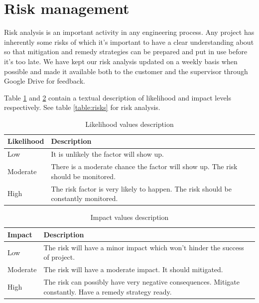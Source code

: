 \newpage
\section{Risk management}
\label{section:risk}

Risk analysis is an important activity in any engineering process.
Any project has inherently some risks of which it's important to have a clear
understanding about so that mitigation and remedy strategies can be prepared
and put in use before it's too late. We have kept our risk analysis updated on a weekly
basis when possible and made it available both to the customer and the supervisor through
Google Drive for feedback.

Table \ref{table:likelihood} and \ref{table:impact} contain a textual description of
likelihood and impact levels respectively. See table \ref{table:risks} for risk analysis.

\begin{table}[h]
\begin{tabular}{ | l | p{11.5cm} | }
  \hline
  \textbf{Likelihood} & \textbf{Description} \\
  \hline\noalign{\smallskip}\hline
  Low       & It is unlikely the factor will show up. \\
  Moderate  & There is a moderate chance the factor will show up. The risk should be monitored. \\
  High      & The risk factor is very likely to happen. The risk should be constantly monitored. \\
  \hline
\end{tabular}
\caption{Likelihood values description}
\label{table:likelihood}
\end{table}

\begin{table}[h]
\begin{tabular}{ | l | p{11.5cm} | }
  \hline
  \textbf{Impact} & \textbf{Description} \\
  \hline\noalign{\smallskip}\hline
  Low       & The risk will have a minor impact which won't hinder the success of project. \\
  Moderate  & The risk will have a moderate impact. It should mitigated. \\
  High      & The risk can possibly have very negative consequences. Mitigate constantly. Have a remedy strategy ready. \\
  \hline
\end{tabular}
\caption{Impact values description}
\label{table:impact}
\end{table}

